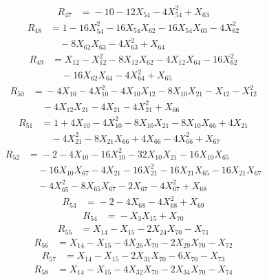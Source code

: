 \[\begin{aligned}
R_{47} &={}-10 - 12X_{54} - 4X_{54}^{2} + X_{63}
\end{aligned}\]
\[\begin{aligned}
R_{48} &={}1 - 16X_{54}^{2} - 16X_{54}X_{62} - 16X_{54}X_{63} - 4X_{62}^{2}\\
&\quad{} - 8X_{62}X_{63} - 4X_{63}^{2} + X_{64}
\end{aligned}\]
\[\begin{aligned}
R_{49} &={}X_{12} - X_{12}^{2} - 8X_{12}X_{62} - 4X_{12}X_{64} - 16X_{62}^{2}\\
&\quad{} - 16X_{62}X_{64} - 4X_{64}^{2} + X_{65}
\end{aligned}\]
\[\begin{aligned}
R_{50} &={}-4X_{10} - 4X_{10}^{2} - 4X_{10}X_{12} - 8X_{10}X_{21} - X_{12} - X_{12}^{2}\\
&\quad{} - 4X_{12}X_{21} - 4X_{21} - 4X_{21}^{2} + X_{66}
\end{aligned}\]
\[\begin{aligned}
R_{51} &={}1 + 4X_{10} - 4X_{10}^{2} - 8X_{10}X_{21} - 8X_{10}X_{66} + 4X_{21}\\
&\quad{} - 4X_{21}^{2} - 8X_{21}X_{66} + 4X_{66} - 4X_{66}^{2} + X_{67}
\end{aligned}\]
\[\begin{aligned}
R_{52} &={}-2 - 4X_{10} - 16X_{10}^{2} - 32X_{10}X_{21} - 16X_{10}X_{65}\\
&\quad{} - 16X_{10}X_{67} - 4X_{21} - 16X_{21}^{2} - 16X_{21}X_{65} - 16X_{21}X_{67}\\
&\quad{} - 4X_{65}^{2} - 8X_{65}X_{67} - 2X_{67} - 4X_{67}^{2} + X_{68}
\end{aligned}\]
\[\begin{aligned}
R_{53} &={}-2 - 4X_{68} - 4X_{68}^{2} + X_{69}
\end{aligned}\]
\[\begin{aligned}
R_{54} &={}-X_{3}X_{15} + X_{70}
\end{aligned}\]
\[\begin{aligned}
R_{55} &={}X_{14} - X_{15} - 2X_{24}X_{70} - X_{71}
\end{aligned}\]
\[\begin{aligned}
R_{56} &={}X_{14} - X_{15} - 4X_{26}X_{70} - 2X_{29}X_{70} - X_{72}
\end{aligned}\]
\[\begin{aligned}
R_{57} &={}X_{14} - X_{15} - 2X_{31}X_{70} - 6X_{70} - X_{73}
\end{aligned}\]
\[\begin{aligned}
R_{58} &={}X_{14} - X_{15} - 4X_{32}X_{70} - 2X_{34}X_{70} - X_{74}
\end{aligned}\]
